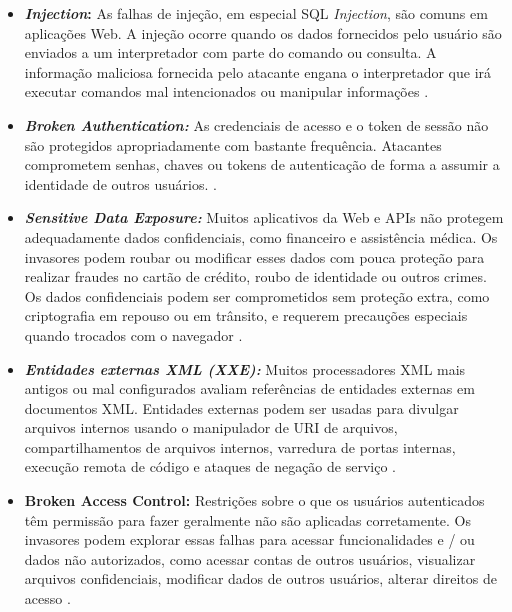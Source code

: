 \begin{itemize}
    
    \item \textbf{\textit{Injection}:} As falhas de injeção, em especial SQL \textit{Injection}, são comuns em aplicações Web. A injeção ocorre quando os dados fornecidos pelo usuário são enviados a um interpretador com parte do comando ou consulta. A informação maliciosa fornecida pelo atacante engana o interpretador que irá executar comandos mal intencionados ou manipular informações \cite{holanda2009segurancca}. 
       
    
    \item \textbf{\textit{Broken Authentication:}} As credenciais de acesso e o token de sessão não são protegidos apropriadamente com bastante frequência. Atacantes comprometem senhas, chaves ou tokens de autenticação de forma a assumir a identidade de outros usuários. \cite{holanda2009segurancca}.
    
     \item \textbf{\textit{Sensitive Data Exposure:}} Muitos aplicativos da Web e APIs não protegem adequadamente dados confidenciais, como financeiro e assistência médica. Os invasores podem roubar ou modificar esses dados com pouca proteção para realizar fraudes no cartão de crédito, roubo de identidade ou outros crimes. Os dados confidenciais podem ser comprometidos sem proteção extra, como criptografia em repouso ou em trânsito, e requerem precauções especiais quando trocados com o navegador \cite{owasp}.
    
    \item \textbf{\textit{Entidades externas XML (XXE):}}  Muitos processadores XML mais antigos ou mal configurados avaliam referências de entidades externas em documentos XML. Entidades externas podem ser usadas para divulgar arquivos internos usando o manipulador de URI de arquivos, compartilhamentos de arquivos internos, varredura de portas internas, execução remota de código e ataques de negação de serviço \cite{owasp}.
    
    \item \textbf{Broken Access Control:}  Restrições sobre o que os usuários autenticados têm permissão para fazer geralmente não são aplicadas corretamente. Os invasores podem explorar essas falhas para acessar funcionalidades e / ou dados não autorizados, como acessar contas de outros usuários, visualizar arquivos confidenciais, modificar dados de outros usuários, alterar direitos de acesso \cite{owasp}.
    

\end{itemize}
